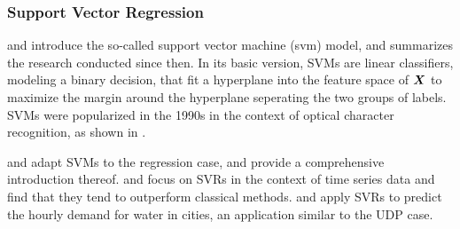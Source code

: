 \subsubsection{Support Vector Regression}
\label{svm}

\cite{vapnik1963} and \cite{vapnik1964} introduce the so-called support vector
    machine (\gls{svm}) model, and \cite{vapnik2013} summarizes the research
    conducted since then.
In its basic version, SVMs are linear classifiers, modeling a binary
    decision, that fit a hyperplane into the feature space of $\bm{X}$ to
    maximize the margin around the hyperplane seperating the two groups of
    labels.
SVMs were popularized in the 1990s in the context of optical character
    recognition, as shown in \cite{scholkopf1998}.

\cite{drucker1997} and \cite{stitson1999} adapt SVMs to the regression case,
    and \cite{smola2004} provide a comprehensive introduction thereof.
\cite{mueller1997} and \cite{mueller1999} focus on SVRs in the context of time
    series data and find that they tend to outperform classical methods.
\cite{chen2006a} and \cite{chen2006b} apply SVRs to predict the hourly demand
    for water in cities, an application similar to the UDP case.

